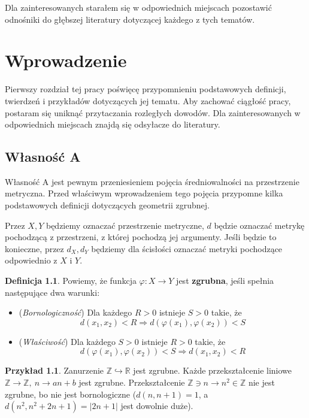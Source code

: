 \documentclass[licencjacka]{pracamgr}
\theoremstyle{definition}
\newtheorem{definition}{Definicja}[section]
\theoremstyle{definition}
\theoremstyle{definition}
\theoremstyle{definition}
\newtheorem{example}{Przykład}[section]
\theoremstyle{definition}
\theoremstyle{plain}
\theoremstyle{plain}
\begin{document}
Dla zainteresowanych starałem się w odpowiednich miejscach pozostawić odnośniki 
do głębszej literatury dotyczącej każdego z tych tematów.

\chapter{Wprowadzenie}

Pierwszy rozdział tej pracy poświęcę przypomnieniu podstawowych definicji, 
twierdzeń i przykładów dotyczących jej tematu. Aby zachować ciągłość pracy, 
postaram się uniknąć przytaczania rozległych dowodów. Dla zainteresowanych 
w odpowiednich miejscach znajdą się odsyłacze do literatury.

\section{Własność A}

Własność A jest pewnym przeniesieniem pojęcia średniowalności na przestrzenie metryczna. 
Przed właściwym wprowadzeniem tego pojęcia przypomne kilka podstawowych 
definicji dotyczących geometrii zgrubnej.

Przez $ X,Y $ będziemy oznaczać przestrzenie metryczne, $ d $ będzie oznaczać metrykę 
pochodzącą z przestrzeni, z której pochodzą jej argumenty. Jeśli będzie to konieczne, 
przez $ d_X, d_Y $ będziemy dla ścisłości oznaczać metryki pochodzące odpowiednio z $ X $ 
i $ Y $.

\begin{definition}
	Powiemy, że funkcja $ \varphi: X \rightarrow Y $ jest \textbf{zgrubna}, jeśli 
	spełnia następujące dwa warunki:
	\begin{itemize}
	\item (\textit{Bornologiczność}) Dla każdego $ R > 0 $ istnieje $ S > 0 $ 
	takie, że 
	$$ d(x_1,x_2) < R \Rightarrow d \left( \varphi(x_1), \varphi(x_2)\right) < S $$
	\item (\textit{Właściwość}) Dla każdego $ S > 0 $ istnieje $ R > 0 $ takie, że 
	$$ d\left(\varphi(x_1), \varphi(x_2)\right) < S \Rightarrow d(x_1,x_2) < R $$
	\end{itemize}
\end{definition}

\begin{example}
	Zanurzenie $ \mathbb{Z} \hookrightarrow \mathbb{R} $ jest zgrubne. Każde 
	przekształcenie liniowe $ \mathbb{Z} \rightarrow \mathbb{Z}, ~ n \rightarrow
	an + b$ jest zgrubne. Przekształcenie $ \mathbb{Z} \ni n \rightarrow n^2 \in 
	\mathbb{Z} $ nie jest zgrubne, bo nie jest bornologiczne ($ d(n, n+1) = 1 $, a 
	$ d(n^2, n^2 + 2n + 1) = |2n+1| $ jest dowolnie duże).
\end{example}
\end{document}
